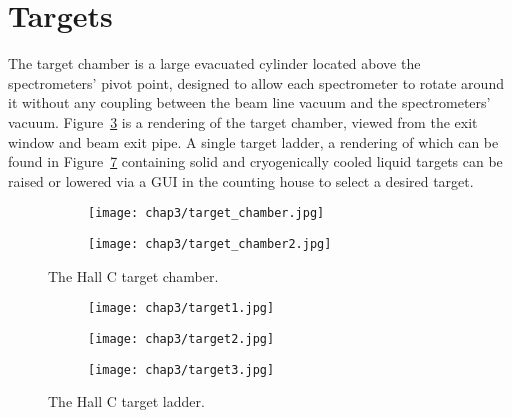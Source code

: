\section{Targets}
The target chamber is a large evacuated cylinder located above the
spectrometers' pivot point, designed to allow each spectrometer to rotate
around it without any coupling between the beam line vacuum and the
spectrometers' vacuum.
Figure~\ref{fig:target_chamber} is a rendering of the target chamber, viewed
from the exit window and beam exit pipe.
A single target ladder, a rendering of which can be found in
Figure~\ref{fig:target_ladder} containing solid and cryogenically cooled liquid
targets can be raised or lowered via a GUI in the counting house to select a
desired target.

\begin{figure}[h]
    \centering
    \begin{subfigure}[b]{0.4\textwidth}
        \centering
        \texttt{[image: chap3/target\_chamber.jpg]}
        \label{fig:target_chamber1}
    \end{subfigure}
    \begin{subfigure}[b]{0.4\textwidth}
        \centering
        \texttt{[image: chap3/target\_chamber2.jpg]}
        \label{fig:target_chamber2}
    \end{subfigure}
    \caption{The Hall  C target chamber.
             }
    \label{fig:target_chamber}
\end{figure}

\begin{figure}[h]
    \centering
    \begin{subfigure}[t]{0.3\textwidth}
        \centering
        \texttt{[image: chap3/target1.jpg]}
        \label{fig:target_ladder1}
    \end{subfigure}
    \hfill
    \begin{subfigure}[t]{0.3\textwidth}
        \centering
        \texttt{[image: chap3/target2.jpg]}
        \label{fig:target_ladder2}
    \end{subfigure}
    \hfill
    \begin{subfigure}[t]{0.3\textwidth}
        \centering
        \texttt{[image: chap3/target3.jpg]}
        \label{fig:target_ladder3}
    \end{subfigure}
    \caption{The Hall C target ladder.
             }
    \label{fig:target_ladder}
\end{figure}

